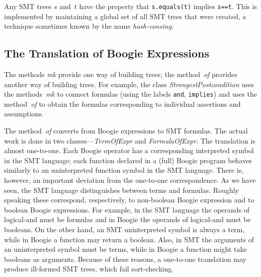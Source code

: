 \documentclass{llncs}
\newcommand{\jmlCode}{\lstinline[style=jml,basicstyle=\normalsize]}
\begin{document}
Any SMT trees $s$ and~$t$ have the property that
\jmlCode|s.equals(t)| implies \jmlCode|s==t|. This is implemented
by maintaining a global set of all SMT trees that were created, a
technique sometimes known by the name \emph{hash-consing}.

\subsection{The Translation of Boogie Expressions} %

The methods \textit{mk} provide one way of building trees; the
method~\textit{of} provides another way of building trees.
For example, the class \textit{StrongestPostcondition} uses
the methods~\textit{mk} to connect formulas (using the labels
\texttt{and}, \texttt{implies}) and uses the method~\textit{of}
to obtain the formulas corresponding to individual assertions and
assumptions.

The method~\textit{of} converts from Boogie expressions
to SMT formulas. The actual work is done in two
classes---\textit{TermOfExpr} and \textit{FormulaOfExpr}. The
translation is almost one-to-one. Each Boogie operator has a
corresponding interpreted symbol in the SMT language; each
function declared in a (full) Boogie program behaves similarly
to an uninterpreted function symbol in the SMT language.
There is, however, an important deviation from the one-to-one
correspondence. As we have seen, the SMT language distinguishes
between terms and formulas. Roughly speaking these correspond,
respectively, to non-boolean Boogie expression and to boolean
Boogie expressions. For example, in the SMT language the
operands of logical-and must be formulas and in Boogie the
operands of logical-and must be booleans. On the other hand, an
SMT uninterpreted symbol is always a term, while in Boogie a
function may return a boolean. Also, in SMT the arguments of an
uninterpreted symbol must be terms, while in Boogie a function
might take booleans as arguments. Because of these reasons, a
one-to-one translation may produce ill-formed SMT trees, which
fail sort-checking.
\end{document}
